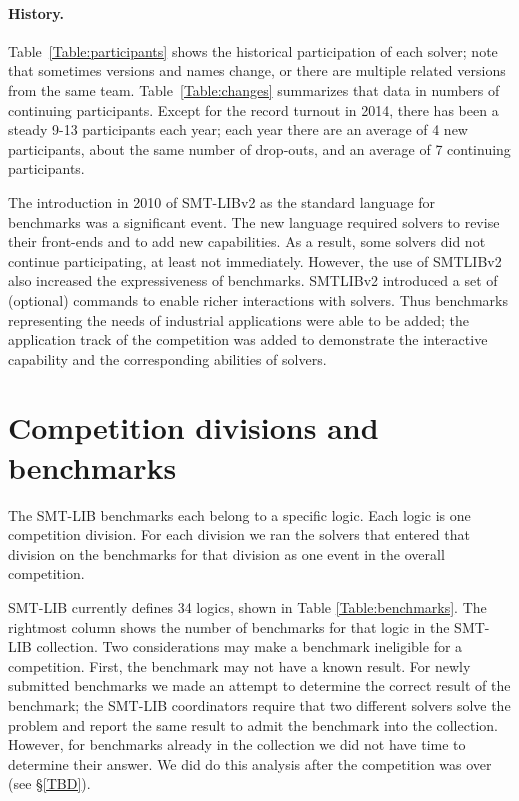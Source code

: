 \documentclass[twoside,11pt]{article}
\begin{document}
\paragraph{History.} Table~\ref{Table:participants} shows the
 historical participation of each solver; note that sometimes versions and names change, or there are multiple related versions from the same team. 
Table~\ref{Table:changes} summarizes that data in numbers of continuing participants. Except for the record turnout in
 2014, there has been a steady 9-13 participants each year; each year there are an average of 4 new
 participants, about the same number of drop-outs, and an average of 7 continuing participants. 

The introduction in 2010 of SMT-LIBv2 as the standard language for benchmarks was a significant event. The new language required solvers to revise their front-ends and to add new capabilities.
As a result, some solvers did not continue participating, at least not immediately. However, the use of SMTLIBv2 also increased the expressiveness of benchmarks. SMTLIBv2 introduced a set of (optional) commands to enable richer interactions with solvers. Thus benchmarks representing the needs of industrial applications were able to be added; 
the application track of the competition was added to demonstrate the interactive capability and the corresponding abilities of solvers.

\section{Competition divisions and benchmarks}
\label{sec:benchmarks}

The SMT-LIB benchmarks each belong to a specific logic. Each logic is one competition division. For each division we ran the solvers that entered that division on the benchmarks for that division as one event in the overall competition.

SMT-LIB currently defines 34 logics, shown in Table \ref{Table:benchmarks}. The rightmost column shows the number of benchmarks for that logic in the SMT-LIB collection. Two considerations may make a benchmark ineligible for a competition. First, the benchmark may not have a known result. For newly submitted benchmarks
we made an attempt to determine the correct result of the benchmark; the SMT-LIB coordinators require that two 
different solvers solve the problem and report the same result to admit the benchmark into the collection.
However, for benchmarks already in the collection we did not have time to determine their answer. We did do this analysis after the competition was over (see \S\ref{TBD}).
\end{document}
